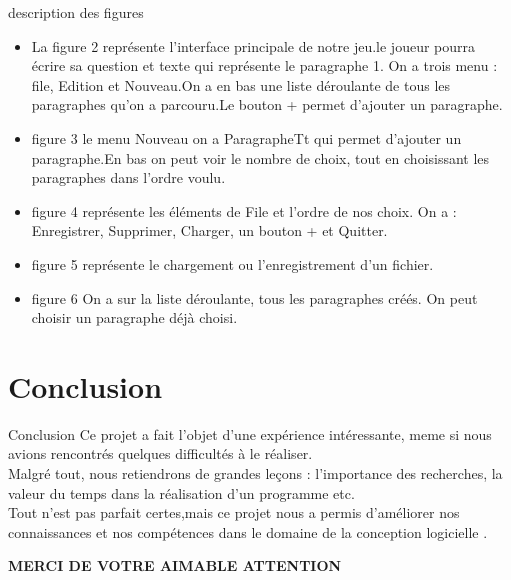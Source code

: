 \documentclass{beamer}
\begin{document}
\begin{frame}{description des figures}
    \begin{itemize}
    \item La figure 2 représente l’interface principale de notre jeu.le joueur pourra écrire sa question et texte qui représente le paragraphe 1. On a trois menu : file, Edition et Nouveau.On a en bas une liste déroulante de tous les paragraphes qu’on a parcouru.Le bouton + permet d’ajouter un paragraphe.\\
    \item figure 3 le menu Nouveau on a ParagrapheTt qui permet d’ajouter un paragraphe.En bas on peut voir le nombre de choix,
    tout en choisissant les paragraphes dans l’ordre voulu.\\ 
    \item figure 4 représente les éléments de File et l’ordre de nos choix.
    On a : Enregistrer, Supprimer, Charger, un bouton + et Quitter.\\
   \item  figure 5 représente le chargement ou l’enregistrement d’un fichier.\\
   \item figure 6 On a sur la liste déroulante, tous les paragraphes créés. On peut choisir un paragraphe
    déjà choisi.
 \end{itemize}
\end{frame}{}
\section{\textbf{Conclusion}}
 \begin{frame}{Conclusion}
     Ce projet a fait l’objet d’une expérience intéressante, meme si nous avions rencontrés quelques difficultés à le réaliser.\\
     Malgré tout, nous retiendrons de grandes leçons : l’importance des recherches, la valeur du temps dans la réalisation d’un programme etc.\\
     Tout n'est pas parfait certes,mais ce projet nous a permis d’améliorer nos connaissances et nos compétences dans le domaine de la conception logicielle .\\
    
 \end{frame}{}

\begin{frame}{}
  \begin{center}
      \textbf{MERCI DE VOTRE AIMABLE ATTENTION} 
  \end{center}     
\end{frame}
\end{document}
